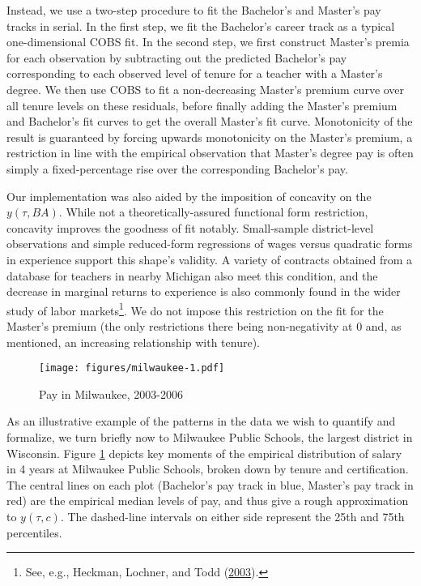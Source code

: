 \documentclass[12pt,]{article}
\let\rmarkdownfootnote\footnote%
\def\footnote{\protect\rmarkdownfootnote}
\begin{document}
Instead, we use a two-step procedure to fit the Bachelor's and Master's
pay tracks in serial. In the first step, we fit the Bachelor's career
track as a typical one-dimensional COBS fit. In the second step, we
first construct Master's premia for each observation by subtracting out
the predicted Bachelor's pay corresponding to each observed level of
tenure for a teacher with a Master's degree. We then use COBS to fit a
non-decreasing Master's premium curve over all tenure levels on these
residuals, before finally adding the Master's premium and Bachelor's fit
curves to get the overall Master's fit curve. Monotonicity of the result
is guaranteed by forcing upwards monotonicity on the Master's premium, a
restriction in line with the empirical observation that Master's degree
pay is often simply a fixed-percentage rise over the corresponding
Bachelor's pay.

Our implementation was also aided by the imposition of concavity on the
\(y(\tau, BA)\). While not a theoretically-assured functional form
restriction, concavity improves the goodness of fit notably.
Small-sample district-level observations and simple reduced-form
regressions of wages versus quadratic forms in experience support this
shape's validity. A variety of contracts obtained from a database for
teachers in nearby Michigan also meet this condition, and the decrease
in marginal returns to experience is also commonly found in the wider
study of labor markets\footnote{See, e.g., Heckman, Lochner, and Todd
  (\protect\hyperlink{ref-heckman}{2003}).}. We do not impose this
restriction on the fit for the Master's premium (the only restrictions
there being non-negativity at 0 and, as mentioned, an increasing
relationship with tenure).

\begin{figure}[htbp]
\centering
\texttt{[image: figures/milwaukee-1.pdf]}
\caption{\label{fig:mwk}Pay in Milwaukee, 2003-2006}
\end{figure}

As an illustrative example of the patterns in the data we wish to
quantify and formalize, we turn briefly now to Milwaukee Public Schools,
the largest district in Wisconsin. Figure \ref{fig:mwk} depicts key
moments of the empirical distribution of salary in 4 years at Milwaukee
Public Schools, broken down by tenure and certification. The central
lines on each plot (Bachelor's pay track in blue, Master's pay track in
red) are the empirical median levels of pay, and thus give a rough
approximation to \(y(\tau, c)\). The dashed-line intervals on either
side represent the 25th and 75th percentiles.
\end{document}
